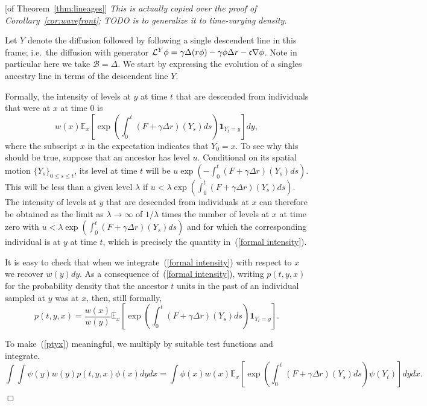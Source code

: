 \documentclass[12pt]{article}
\newenvironment {proof}{{\noindent\bf Proof }}{\hfill $\Box$ \medskip}
\newcommand{\IE}{\mathbb E}
\newcommand{\ind}{\mathbf{1}}
\newcommand{\comment}[1]{{\color{blue} \it #1}}
\begin{document}
\begin{proof}[of Theorem~\ref{thm:lineages}]
    \comment{
        This is actually copied over the proof of Corollary~\ref{cor:wavefront};
        TODO is to generalize it to time-varying density.
    }

Let $Y$ denote the diffusion followed by following a single descendent line in this frame; 
i.e.~the diffusion with generator ${\cal L}^Y\phi=\gamma\Delta(r\phi)-\gamma\phi\Delta r -\mathfrak{c}\nabla\phi $. Note in particular here we take $\mathcal{B}=\Delta$. We start by expressing the evolution of a singles ancestry line in terms of the descendent line $Y$.

Formally, the intensity of levels at $y$ at time $t$ that are descended from 
individuals that were at $x$ at time $0$ is
\begin{equation}
\label{formal intensity}
w(x)\IE_x\left[\exp\left(\int_0^t (F+\gamma \Delta r)(Y_s)ds\right)\ind_{Y_t=y}\right]dy,
\end{equation}
where the subscript $x$ in the expectation indicates that $Y_0=x$.
To see why this should be true, 
suppose that an ancestor has level $u$. Conditional on its 
spatial motion $\{Y_s\}_{0\leq s\leq t}$, its level at time $t$ will
be $u\exp(-\int_0^t(F+\gamma\Delta r)(Y_s)ds)$. This will be less than a given level 
$\lambda$ if $u<\lambda \exp(\int_0^t(F+\gamma\Delta r)(Y_s)ds)$. 
The intensity of levels at $y$ that are descended from individuals at
$x$ can therefore be obtained as the limit as $\lambda\to\infty$ of 
$1/\lambda$ times the number of levels at $x$ at time zero with
$u<\lambda \exp(\int_0^t(F+\gamma\Delta r)(Y_s)ds)$ and for which
the corresponding individual is at $y$ at time $t$, which is 
precisely the quantity in~(\ref{formal intensity}). 

It is easy to check that when we integrate~(\ref{formal intensity})
with respect to $x$ we recover $w(y)dy$. 
As a consequence of~(\ref{formal intensity}), writing $p(t,y,x)$ for
the probability density that the ancestor $t$ units in 
the past of an individual sampled 
at $y$ was at $x$, then, still formally,
\begin{equation}
\label{ptyx}
p(t,y,x)=\frac{w(x)}{w(y)}\IE_x\left[\exp\left(\int_0^t (F+\gamma\Delta r)(Y_s)ds\right)
\ind_{Y_t=y}\right].
\end{equation}

To make~(\ref{ptyx}) meaningful, we multiply by suitable test functions and 
integrate.
$$\int\int \psi(y)w(y)p(t,y,x)\phi(x)dydx=\int\phi(x)w(x)
\IE_x\left[\exp\left(\int_0^t(F+\gamma\Delta r)(Y_s)ds\right)\psi(Y_t)\right]dydx.$$


\end{proof}
\end{document}
